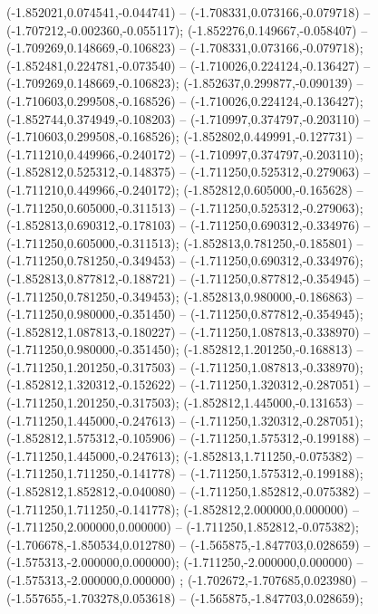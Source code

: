  (-1.852021,0.074541,-0.044741) -- (-1.708331,0.073166,-0.079718) -- (-1.707212,-0.002360,-0.055117);
 (-1.852276,0.149667,-0.058407) -- (-1.709269,0.148669,-0.106823) -- (-1.708331,0.073166,-0.079718);
 (-1.852481,0.224781,-0.073540) -- (-1.710026,0.224124,-0.136427) -- (-1.709269,0.148669,-0.106823);
 (-1.852637,0.299877,-0.090139) -- (-1.710603,0.299508,-0.168526) -- (-1.710026,0.224124,-0.136427);
 (-1.852744,0.374949,-0.108203) -- (-1.710997,0.374797,-0.203110) -- (-1.710603,0.299508,-0.168526);
 (-1.852802,0.449991,-0.127731) -- (-1.711210,0.449966,-0.240172) -- (-1.710997,0.374797,-0.203110);
 (-1.852812,0.525312,-0.148375) -- (-1.711250,0.525312,-0.279063) -- (-1.711210,0.449966,-0.240172);
 (-1.852812,0.605000,-0.165628) -- (-1.711250,0.605000,-0.311513) -- (-1.711250,0.525312,-0.279063);
 (-1.852813,0.690312,-0.178103) -- (-1.711250,0.690312,-0.334976) -- (-1.711250,0.605000,-0.311513);
 (-1.852813,0.781250,-0.185801) -- (-1.711250,0.781250,-0.349453) -- (-1.711250,0.690312,-0.334976);
 (-1.852813,0.877812,-0.188721) -- (-1.711250,0.877812,-0.354945) -- (-1.711250,0.781250,-0.349453);
 (-1.852813,0.980000,-0.186863) -- (-1.711250,0.980000,-0.351450) -- (-1.711250,0.877812,-0.354945);
 (-1.852812,1.087813,-0.180227) -- (-1.711250,1.087813,-0.338970) -- (-1.711250,0.980000,-0.351450);
 (-1.852812,1.201250,-0.168813) -- (-1.711250,1.201250,-0.317503) -- (-1.711250,1.087813,-0.338970);
 (-1.852812,1.320312,-0.152622) -- (-1.711250,1.320312,-0.287051) -- (-1.711250,1.201250,-0.317503);
 (-1.852812,1.445000,-0.131653) -- (-1.711250,1.445000,-0.247613) -- (-1.711250,1.320312,-0.287051);
 (-1.852812,1.575312,-0.105906) -- (-1.711250,1.575312,-0.199188) -- (-1.711250,1.445000,-0.247613);
 (-1.852813,1.711250,-0.075382) -- (-1.711250,1.711250,-0.141778) -- (-1.711250,1.575312,-0.199188);
 (-1.852812,1.852812,-0.040080) -- (-1.711250,1.852812,-0.075382) -- (-1.711250,1.711250,-0.141778);
 (-1.852812,2.000000,0.000000) -- (-1.711250,2.000000,0.000000) -- (-1.711250,1.852812,-0.075382);
 (-1.706678,-1.850534,0.012780) -- (-1.565875,-1.847703,0.028659) -- (-1.575313,-2.000000,0.000000);
 (-1.711250,-2.000000,0.000000) -- (-1.575313,-2.000000,0.000000) ;
 (-1.702672,-1.707685,0.023980) -- (-1.557655,-1.703278,0.053618) -- (-1.565875,-1.847703,0.028659);
